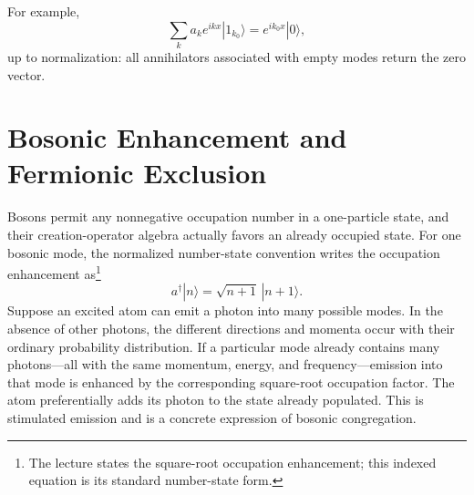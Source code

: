 \begin{classroomqa}
\end{classroomqa}

\begin{classroomqa}
\end{classroomqa}

\begin{classroomqa}
\end{classroomqa}

For example,
\begin{equation}
\sum_k a_k e^{ikx}|1_{k_0}\rangle
=e^{ik_0x}|0\rangle,
\end{equation}
up to normalization: all annihilators associated with empty modes return the zero vector.

\section{Bosonic Enhancement and Fermionic Exclusion}

Bosons permit any nonnegative occupation number in a one-particle state, and their creation-operator algebra actually favors an already occupied state. For one bosonic mode, the normalized number-state convention writes the occupation enhancement as\footnote{The lecture states the square-root occupation enhancement; this indexed equation is its standard number-state form.}
\begin{equation}
a^\dagger|n\rangle=\sqrt{n+1}\,|n+1\rangle.
\end{equation}
Suppose an excited atom can emit a photon into many possible modes. In the absence of other photons, the different directions and momenta occur with their ordinary probability distribution. If a particular mode already contains many photons---all with the same momentum, energy, and frequency---emission into that mode is enhanced by the corresponding square-root occupation factor. The atom preferentially adds its photon to the state already populated. This is stimulated emission and is a concrete expression of bosonic congregation.

